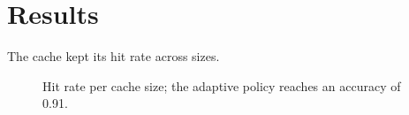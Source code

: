 \section{Results}
The cache kept its hit rate across sizes.
\begin{figure}
\caption{Hit rate per cache size; the adaptive policy reaches an accuracy of 0.91.}
\end{figure}
